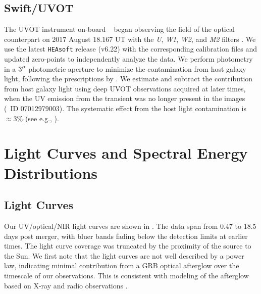 \subsection{Swift/UVOT}
\label{sec:ch5_data_UVOT}
The UVOT instrument on-board \swift\ \citep{Gehrels+04, Roming+05} began observing the field of the optical counterpart on 2017 August 18.167 UT with the {\it U}, {\it W1}, {\it W2}, and {\it M2} filters \citep{Evans+17}.  We use the latest {\tt HEAsoft} release (v6.22) with the corresponding calibration files and updated zero-points to independently analyze the data. We perform photometry in a $3\hbox{$^{\prime\prime}$}$ photometric aperture to minimize the contamination from host galaxy light, following the prescriptions by \citet{Brown+09}. We estimate and subtract the contribution from host galaxy light using deep UVOT observations acquired at later times, when the UV emission from the transient was no longer present in the images (\swift\ ID 07012979003). The systematic effect from the host light contamination is $\approx 3\%$ (see e.g., \citealt{Brown+09}).

\section{Light Curves and Spectral Energy Distributions}
\label{sec:ch5_analysis}

\subsection{Light Curves}
\label{sec:ch5_lc}

Our UV/optical/NIR light curves are shown in . The data span from 0.47 to 18.5 days post merger, with bluer bands fading below the detection limits at earlier times.  The light curve coverage was truncated by the proximity of the source to the Sun.  We first note that the light curves are not well described by a power law, indicating minimal contribution from a GRB optical afterglow over the timescale of our observations. This is consistent with modeling of the afterglow based on X-ray and radio observations \citep{Alexander+17,Margutti+17}.


